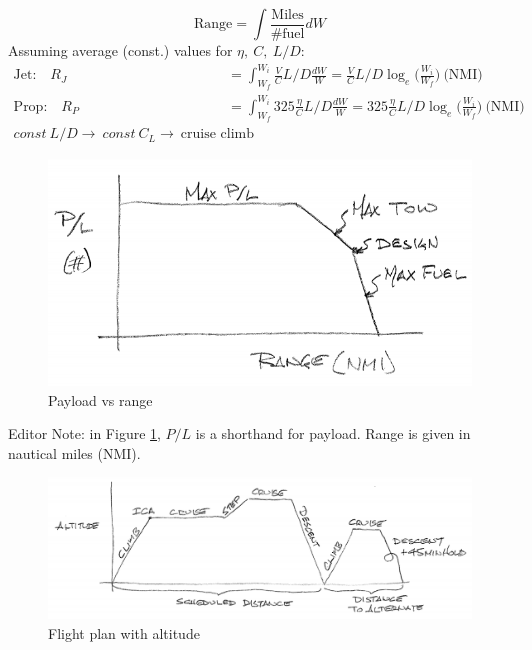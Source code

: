 \documentclass[draft=false, titlepage]{article}
\begin{document}
\begin{equation*}
\text{Range} = \int \frac{\text{Miles}}{\text{\# fuel}} dW
\end{equation*}
Assuming average (const.) values for $\eta,\ C,\ L/D$:
\begin{align*}
\text{Jet:}\quad R_J &= \int_{W_f}^{W_i} \frac{V}{C}L/D \frac{dW}{W} = \frac{V}{C} L/D\log_e\big(\frac{W_i}{W_f}\big)\ \text{(NMI)}\\
\text{Prop:} \quad R_P &= \int_{W_f}^{W_i} 325 \frac{\eta}{C} L/D\frac{dW}{W}= 325 \frac{\eta}{C}L/D \log_e\big(\frac{W_i}{W_f}\big)\ \text{(NMI)}\\
const\ L/D \rightarrow\ const\ C_L \rightarrow\ \text{cruise climb}
\end{align*}
\begin{figure}[ht]
	\centering
	\includegraphics[width=0.5\linewidth]{Figures/p84_range.PNG}
	\caption{Payload vs range}
	\label{fig:p84_range}
\end{figure}
Editor Note: in Figure \ref{fig:p84_range}, $P/L$ is a shorthand for payload. Range is given in nautical miles (NMI).
\begin{figure}[ht]
	\centering
	\includegraphics[width=0.9\linewidth]{Figures/p84_flightPlan.PNG}
	\caption{Flight plan with altitude}
	\label{fig:p84_flightPlan}
\end{figure}
\end{document}
